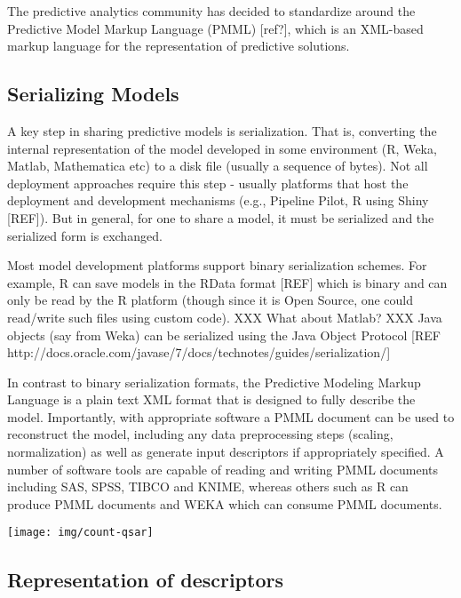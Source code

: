\documentclass[12pt,letterpaper]{article}
\begin{document}
The predictive analytics community has decided to standardize around
the Predictive Model Markup Language (PMML) [ref?], which is an XML-based
markup language for the representation of predictive solutions. 

\subsection{Serializing Models}
\label{sec:serializing-models}

A key step in sharing predictive models is serialization. That is,
converting the internal representation of the model developed in some
environment (R, Weka, Matlab, Mathematica etc) to a disk file (usually
a sequence of bytes). Not all deployment approaches require this step
- usually platforms that host the deployment and development
mechanisms (e.g., Pipeline Pilot, R using Shiny [REF]). But in general, for one to share a
model, it must be serialized and the serialized form is exchanged.

Most model development platforms support binary serialization
schemes. For example, R can save models in the RData format [REF]
which is binary and can only be read by the R platform (though since
it is Open Source, one could read/write such files using custom
code). XXX What about Matlab? XXX Java objects (say from Weka) can
be serialized using the Java Object Protocol [REF http://docs.oracle.com/javase/7/docs/technotes/guides/serialization/]

In contrast to binary serialization formats, the Predictive Modeling
Markup Language is a plain text XML format that is designed to fully
describe the model. Importantly, with appropriate software a PMML
document can be used to reconstruct the model, including any data
preprocessing steps (scaling, normalization) as well as generate input
descriptors if appropriately specified. A number of software tools are
capable of reading and writing PMML documents including SAS, SPSS,
TIBCO and KNIME, whereas others such as R can produce PMML documents
and WEKA which can consume PMML documents.

{}
{
  \texttt{[image: img/count-qsar]}
}

\subsection{Representation of descriptors}
\end{document}
